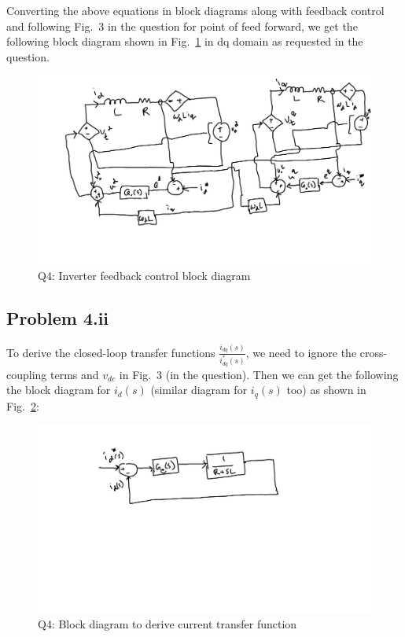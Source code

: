 Converting the above equations in block diagrams along with feedback control and following Fig.~3 in the question for point of feed forward, we get the following block diagram shown in Fig.~\ref{fig:q4_block_dia} in dq domain as requested in the question.
\begin{figure}[!h]
	\centering
	\includegraphics[scale=0.4,trim={2cm 4cm 0cm 0cm},clip]{q4_block_dia.pdf}
	\caption{Q4: Inverter feedback control block diagram}
	\label{fig:q4_block_dia}
\end{figure}
\subsection*{Problem 4.ii}
To derive the closed-loop transfer functions $\frac{i_{dq}(s)}{i_{dq}^*(s)}$, we need to ignore the cross-coupling terms and $v_{dc}$ in Fig.~3 (in the question). Then we can get the following the block diagram for $i_d(s)$ (similar diagram for $i_q(s)$ too) as shown in Fig.~\ref{fig:q4_tf}:
\begin{figure}[!h]
	\centering
	\includegraphics[scale=0.4,trim={2cm 12cm 0cm 0cm},clip]{q4_tf.pdf}
	\caption{Q4: Block diagram to derive current transfer function}
	\label{fig:q4_tf}
\end{figure}

